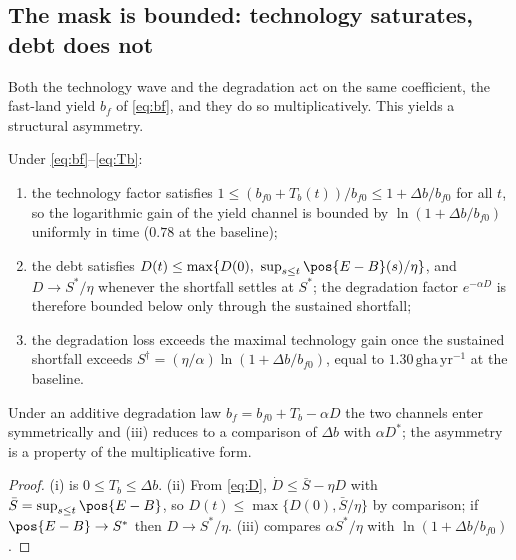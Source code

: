 \subsection{The mask is bounded: technology saturates, debt does not}\label{sec:bounded}

Both the technology wave and the degradation act on the same coefficient, the fast-land yield $b_f$ of \eqref{eq:bf}, and they do so multiplicatively. This yields a structural asymmetry.

\begin{proposition}\label{prop:bounded}
Under \eqref{eq:bf}--\eqref{eq:Tb}:
\begin{enumerate}[label=(\roman*)]
\item the technology factor satisfies $1\le(b_{f0}+T_b(t))/b_{f0}\le1+\Delta b/b_{f0}$ for all $t$, so the logarithmic gain of the yield channel is bounded by $\ln(1+\Delta b/b_{f0})$ uniformly in time ($0.78$ at the baseline);
\item the debt satisfies $D(t)\le\max\{D(0),\ \sup_{s\le t}\pos{E-B}(s)/\eta\}$, and $D\to S^*/\eta$ whenever the shortfall settles at $S^*$; the degradation factor $e^{-\alpha D}$ is therefore bounded below only through the sustained shortfall;
\item the degradation loss exceeds the maximal technology gain once the sustained shortfall exceeds $S^\dagger=(\eta/\alpha)\ln(1+\Delta b/b_{f0})$, equal to $1.30\,\mathrm{gha\,yr^{-1}}$ at the baseline.
\end{enumerate}
Under an additive degradation law $b_f=b_{f0}+T_b-\alpha D$ the two channels enter symmetrically and (iii) reduces to a comparison of $\Delta b$ with $\alpha D^*$; the asymmetry is a property of the multiplicative form.
\end{proposition}

\begin{proof}
(i) is $0\le T_b\le\Delta b$. (ii) From \eqref{eq:D}, $\dot D\le\bar S-\eta D$ with $\bar S=\sup_{s\le t}\pos{E-B}$, so $D(t)\le\max\{D(0),\bar S/\eta\}$ by comparison; if $\pos{E-B}\to S^*$ then $D\to S^*/\eta$. (iii) compares $\alpha S^*/\eta$ with $\ln(1+\Delta b/b_{f0})$.
\end{proof}

